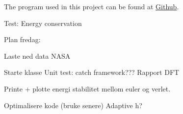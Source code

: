 


The program used in this project can be found at \href{https://github.com/kjetka/Project3}{Github}. 



Test: Energy conservation



Plan fredag:

	Laste ned data NASA

	Starte klasse
	Unit test: catch framework???
	Rapport DFT
	
	
	Printe + plotte energi stabilitet mellom euler og verlet.
	
	Optimalisere kode (bruke senere)
	Adaptive h?

